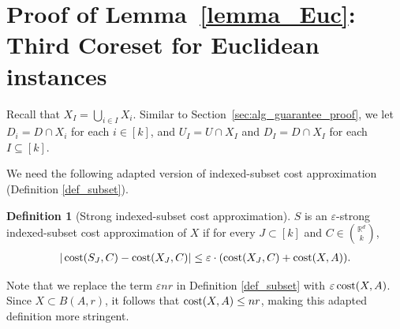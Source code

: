\documentclass[11pt,letterpaper]{article}
\theoremstyle{definition}
\newtheorem{definition}[theorem]{Definition}
\newcommand{\eps}{\varepsilon}
\DeclareMathOperator*{\argmin}{arg\,min}
\begin{document}










%
\section{Proof of Lemma~\ref{lemma_Euc}: Third Coreset for Euclidean instances}

\label{sec_euc}


Recall that $X_I = \bigcup_{i\in I} X_i$.
%
Similar to Section~\ref{sec:alg_guarantee_proof}, we let $D_i=D\cap X_i$ for each $i\in [k]$, and $U_I = U \cap X_I$ and $D_I = D \cap X_I$ for each $I\subseteq [k]$.

We need the following adapted version of indexed-subset cost approximation (Definition \ref{def_subset}).

\begin{definition}[Strong indexed-subset cost approximation]\label{def_strong_subset} $S$ is an $\eps$-strong indexed-subset cost approximation of $X$ if for every $J\subset [k]$ and $C\in \binom{\mathbb{R}^d}{k}$,
\begin{eqnarray}\label{inq_strong_subset}
|\cost(S_J,C)-\cost(X_J,C)|\leq \eps\cdot (\cost(X_J,C)+\cost(X,A)).
\end{eqnarray}
\end{definition}

Note that we replace the term \( \eps n r \) in Definition \ref{def_subset} with \( \eps \cost(X, A) \).  
%
Since \( X \subset B(A, r) \), it follows that \( \cost(X, A) \leq n r \), making this adapted definition more stringent.

\end{document}

